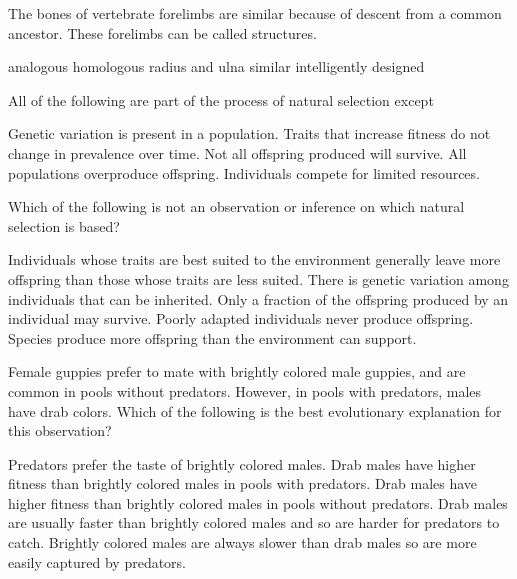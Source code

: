 \question
The bones of vertebrate forelimbs are similar because of descent from a common ancestor. These forelimbs can be called \underline{\hspace{2cm}} structures.

\begin{choices}
\choice analogous
\correctchoice homologous
\choice radius and ulna
\choice similar
\choice intelligently designed
\end{choices}

\question
All of the following are part of the process of natural selection except

\begin{choices}
\choice Genetic variation is present in a population.
\correctchoice Traits that increase fitness do not change in prevalence over time.
\choice Not all offspring produced will survive.
\choice All populations overproduce offspring.
\choice Individuals compete for limited resources.
\end{choices}

\question
Which of the following is not an observation or inference on which natural selection is based?

\begin{choices}
\choice Individuals whose traits are best suited to the environment generally leave more offspring than those whose traits are less suited.
\choice There is genetic variation among individuals that can be inherited.
\choice Only a fraction of the offspring produced by an individual may survive.
\correctchoice Poorly adapted individuals never produce offspring.
\choice Species produce more offspring than the environment can support.
\end{choices}

\question
Female guppies prefer to mate with brightly colored male guppies, and are common in pools without predators. However, in pools with predators, males have drab colors. Which of the following is the best evolutionary explanation for this observation?

\begin{choices}
\choice Predators prefer the taste of brightly colored males.
\correctchoice Drab males have higher fitness than brightly colored males in pools with predators.
\choice Drab males have higher fitness than brightly colored males in pools without predators.
\choice Drab males are usually faster than brightly colored males and so are harder for predators to catch.
\choice Brightly colored males are always slower than drab males so are more easily captured by predators.
\end{choices}

